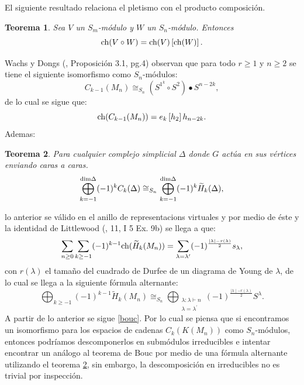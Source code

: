 \documentclass[12pt]{book}
\newtheorem{theorem}{Teorema}[section]
\theoremstyle{definition}
\newcounter{in}
\begin{document}
El siguiente resultado relaciona el pletismo con el producto
composición.
\begin{theorem}
  \label{cp_po}
  Sea $V$ un $S_{m}$-módulo y $W$ un $S_{n}$-módulo. Entonces
  \begin{equation}
    \label{eq:109}
    \textup{ch}(V \circ W) = \textup{ch}(V)\left [ \textup{ch}(W) \right ].
  \end{equation}
\end{theorem}
Wachs y Dongs \normalfont(\cite{dong2002combinatorial}, Proposición 3.1,
pg.4) observan que para todo $r \geq 1$ y $n \geq 2$ se tiene el
siguiente isomorfismo como $S_n$-módulos:
\begin{equation}
  \label{eq:93}
  C_{k-1}(M_n) \cong_{S_{n}} (S^{1^{k}} \circ S^{2}) \bullet S^{n-2k},
\end{equation}
 de lo cual se sigue que:
\begin{equation}
  \label{eq:92}
  \textup{ch}(C_{k-1}(M_n)) = e_{k}\left [ h_{2} \right ]h_{n-2k}.
\end{equation}
Ademas:
\begin{theorem}
  \label{hopf}
  Para cualquier complejo simplicial $\Delta$ donde $G$ actúa en sus
  vértices enviando caras a caras.
  \begin{equation}
    \label{eq:110}
    \bigoplus_{k = -1}^{\textup{dim} \Delta}(-1)^{k}C_{k}(\Delta)\cong_{S_{n}} \bigoplus_{k = -1}^{\textup{dim} \Delta}(-1)^{k}\widetilde{H}_k(\Delta),
  \end{equation}
\end{theorem}
lo anterior se válido en el anillo de representacions virtuales y por
medio de éste y la identidad de Littlewood
\normalfont(\cite{macdonald1998symmetric}, 11, I 5 Ex. 9b) se llega a
que:
\begin{equation}
  \label{eq:90}
\sum_{n \geq 0} \sum_{k \geq -1}(-1)^{k-1}\textup{ch}(\widetilde{H}_k(M_n)) = \sum_{\lambda = {\lambda}'}(-1)^{\frac{\mid \lambda \mid - r(\lambda)}{2}}s_{\lambda},  
\end{equation}
con $r(\lambda)$ el tamaño del cuadrado de Durfee de un diagrama de
Young de $\lambda$, de lo cual se llega a la siguiente fórmula
alternante:
\begin{equation}
  \label{eq:111}
  \bigoplus_{k \geq -1}(-1)^{k-1}\widetilde{H}_k(M_n) \cong_{S_{n}} \bigoplus_{\substack{\lambda:\lambda\vdash n\\
      \lambda=\lambda^{'}}} (-1)^{\frac{\mid \lambda \mid - r(\lambda)}{2}}S^{\lambda}.
\end{equation}
  A partir de lo anterior se sigue \ref{bouc}. Por lo
  cual se piensa que si encontramos un isomorfismo para los espacios
  de cadenas $C_k(K(M_n))$ como $S_n$-módulos, entonces podríamos
  descomponerlos en submódulos irreducibles e intentar encontrar un
  análogo al teorema de Bouc por medio de una fórmula alternante
  utilizando el teorema \ref{hopf}, sin embargo, la descomposición en
  irreducibles no es trivial por inspección.
\end{document}
